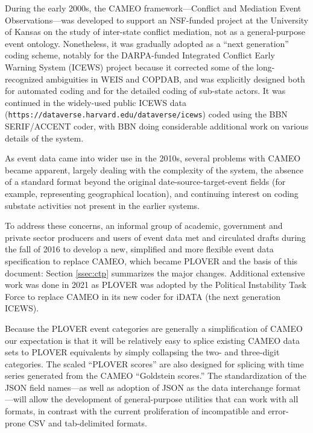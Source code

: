 \documentclass[11pt]{report}
\newcommand{\txt}[1]{\texttt{#1}}
\begin{document}
During the early 2000s, the CAMEO framework---Conflict and Mediation Event Observations---was developed \citep{SGY09} to support an NSF-funded project at the University of Kansas on the study of inter-state conflict mediation, not as a general-purpose event ontology. Nonetheless, it was gradually adopted as a ``next generation'' coding scheme, notably for the DARPA-funded Integrated Conflict Early Warning System (ICEWS) project \citep{OBrien10} because it corrected some of the long-recognized ambiguities in WEIS and COPDAB, and was explicitly designed both for automated coding and for the detailed coding of sub-state actors. It was continued in the widely-used public ICEWS data (\txt{https://dataverse.harvard.edu/dataverse/icews}) coded using the BBN SERIF/ACCENT coder, with BBN doing considerable additional work on various details of the system.

As event data came into wider use in the 2010s, several problems with CAMEO became apparent, largely dealing with the complexity of the system, the absence of a standard format beyond the original  date-source-target-event fields (for example, representing geographical location), and continuing interest on coding substate activities not present in the earlier systems. 

To address these concerns, an informal group of academic, government and private sector producers and users of event data met and circulated drafts during the fall of 2016 to develop a new, simplified and more flexible event data specification to replace CAMEO, which became PLOVER and the basis of this document: Section \ref{ssec:ctp} summarizes the major changes. Additional extensive
work was done in 2021 as PLOVER was adopted by the Political Instability Task Force to replace
CAMEO in its new coder for iDATA (the next generation ICEWS).

Because the PLOVER event categories are generally a simplification of CAMEO our expectation is that it will be relatively easy to splice existing CAMEO data sets to PLOVER equivalents by simply collapsing the two- and three-digit categories. The scaled ``PLOVER scores'' are also designed for splicing with time series generated from the CAMEO ``Goldstein scores.'' The standardization of the JSON field names---as well as adoption of JSON as the data interchange format---will allow the development of general-purpose utilities that can work with all formats, in contrast with the current proliferation of incompatible and error-prone CSV and tab-delimited formats.
\end{document}

